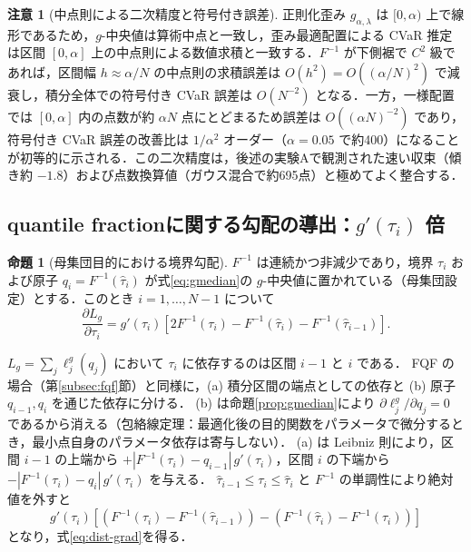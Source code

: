 \documentclass[a4paper,10pt]{jsarticle}
\makeatletter
\theoremstyle{definition}
\newtheorem{proposition}{命題}[section]
\newtheorem{remark}{注意}[section]
\renewenvironment{proof}[1][\proofname]{\par
  \pushQED{\qed}%
  \normalfont \topsep6\p@\@plus6\p@\relax
  \trivlist
  \item[\hskip\labelsep\textbf{#1}]\ignorespaces
}{%
  \popQED\endtrivlist\@endpefalse
}
\renewcommand{\proofname}{証明}
\newcommand{\Finv}{F^{-1}}
\makeatother
\begin{document}
\begin{remark}[中点則による二次精度と符号付き誤差]
\label{rem:midpoint}
正則化歪み $g_{\alpha,\lambda}$ は $[0,\alpha)$ 上で線形であるため，$g$-中央値は算術中点と一致し，歪み最適配置による CVaR 推定は区間 $[0,\alpha]$ 上の中点則による数値求積と一致する．$\Finv$ が下側裾で $C^2$ 級であれば，区間幅 $h\approx\alpha/N$ の中点則の求積誤差は $O(h^2)=O((\alpha/N)^2)$ で減衰し，積分全体での符号付き CVaR 誤差は $O(N^{-2})$ となる．一方，一様配置では $[0,\alpha]$ 内の点数が約 $\alpha N$ 点にとどまるため誤差は $O((\alpha N)^{-2})$ であり，符号付き CVaR 誤差の改善比は $1/\alpha^2$ オーダー（$\alpha=0.05$ で約400）になることが初等的に示される．この二次精度は，後述の実験Aで観測された速い収束（傾き約 $-1.8$）および点数換算値（ガウス混合で約695点）と極めてよく整合する．
\end{remark}
\subsection{quantile fractionに関する勾配の導出：$g'(\tau_i)$ 倍}
\begin{proposition}[母集団目的における境界勾配]
\label{prop:grad}
$\Finv$ は連続かつ非減少であり，境界 $\tau_i$ および原子 $q_i=\Finv(\hat\tau_i)$ が式\eqref{eq:gmedian}の $g$-中央値に置かれている（母集団設定）とする．このとき $i=1,\dots,N-1$ について
\begin{equation}
  \frac{\partial L_g}{\partial\tau_i}=g'(\tau_i)\left[2\Finv(\tau_i)-\Finv(\hat\tau_i)-\Finv(\hat\tau_{i-1})\right].
  \label{eq:dist-grad}
\end{equation}
\end{proposition}
\begin{proof}
$L_g=\sum_j\ell_j^g(q_j)$ において $\tau_i$ に依存するのは区間 $i-1$ と $i$ である．
FQF の場合（第\ref{subsec:fqf}節）と同様に，(a) 積分区間の端点としての依存と (b) 原子 $q_{i-1},q_i$ を通じた依存に分ける．
(b) は命題\ref{prop:gmedian}により $\partial\ell^g_j/\partial q_j=0$ であるから消える（包絡線定理：最適化後の目的関数をパラメータで微分するとき，最小点自身のパラメータ依存は寄与しない）．
(a) は Leibniz 則により，区間 $i-1$ の上端から $+|\Finv(\tau_i)-q_{i-1}|\,g'(\tau_i)$，区間 $i$ の下端から $-|\Finv(\tau_i)-q_i|\,g'(\tau_i)$ を与える．
$\hat\tau_{i-1}\le\tau_i\le\hat\tau_i$ と $\Finv$ の単調性により絶対値を外すと
\begin{equation*}
  g'(\tau_i)\left[\left(\Finv(\tau_i)-\Finv(\hat\tau_{i-1})\right)-\left(\Finv(\hat\tau_i)-\Finv(\tau_i)\right)\right]
\end{equation*}
となり，式\eqref{eq:dist-grad}を得る．
\end{proof}
\end{document}
